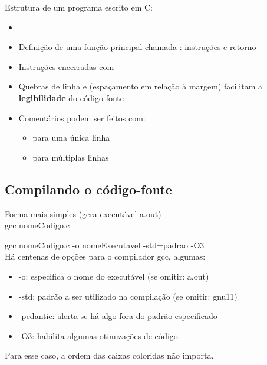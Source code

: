 \documentclass[portuguese,10pt,xcolor=table]{beamer}
\begin{document}
	\begin{frame}
		Estrutura  de um programa escrito em C:
	        
	  \begin{itemize}
		  \item {}
		  \item Definição de uma função principal chamada : instruções e retorno
	  \end{itemize}
	\end{frame}

	\begin{frame}
	        
	  \begin{itemize}
		  \item Instruções encerradas com \textdf{;}
		  \item Quebras de linha e  (espaçamento em relação à margem) facilitam a \textbf{legibilidade} do código-fonte
		  \item Comentários podem ser feitos com:
			  \begin{itemize}
				  \item \textdf{//} para uma única linha
				  \item {} para múltiplas linhas
			  \end{itemize}
	  \end{itemize}
	\end{frame}


	\subsection{Compilando o código-fonte}
	\begin{frame}
		Forma mais simples (gera executável a.out)\\
		gcc
		\colorbox{gray!30}{nomeCodigo.c}

		\vspace{0.5cm}
		gcc
		\colorbox{gray!30}{nomeCodigo.c}
		\colorbox{orange!30}{-o nomeExecutavel}
		\colorbox{yellow!30}{-std=padrao}
		\colorbox{red!30}{-O3}\\
			Há centenas de opções para o compilador gcc, algumas:
	  \begin{itemize}
		  \item -o: especifica o nome do executável (se omitir: a.out)
		  \item -std: padrão a ser utilizado na compilação (se omitir: gnu11)
		  \item -pedantic: alerta se há algo fora do padrão especificado
		  \item -O3: habilita algumas otimizações de código
	  \end{itemize}
		Para esse caso, a ordem das caixas coloridas não importa.\\
	\end{frame}
\end{document}
